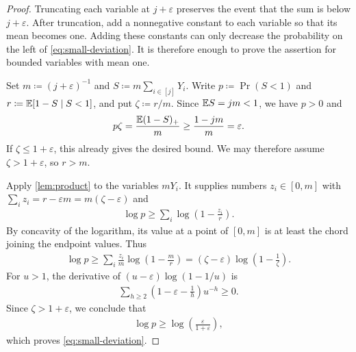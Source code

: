 \begin{proof}
Truncating each variable at $j+\varepsilon$ preserves the event that the sum is below $j+\varepsilon$.
After truncation, add a nonnegative constant to each variable so that its mean becomes one.
Adding these constants can only decrease the probability on the left of \cref{eq:small-deviation}.
It is therefore enough to prove the assertion for bounded variables with mean one.

Set $m\coloneqq(j+\varepsilon)^{-1}$ and $S\coloneqq m\sum_{i\in[j]}Y_i$.
Write $p\coloneqq\Pr(S<1)$ and $r\coloneqq\mathbb E[1-S\mid S<1]$, and put $\zeta\coloneqq r/m$.
Since $\mathbb E S=jm<1$, we have $p>0$ and
\begin{align*}
 p\zeta=\frac{\mathbb E(1-S)_+}{m}\ge\frac{1-jm}{m}=\varepsilon.
\end{align*}
If $\zeta\le1+\varepsilon$, this already gives the desired bound.
We may therefore assume $\zeta>1+\varepsilon$, so $r>m$.

Apply \cref{lem:product} to the variables $mY_i$.
It supplies numbers $z_i\in[0,m]$ with $\sum_i z_i=r-\varepsilon m=m(\zeta-\varepsilon)$ and
\begin{align*}
 \log p\ge\sum_i\log\left(1-\frac{z_i}{r}\right).
\end{align*}
By concavity of the logarithm, its value at a point of $[0,m]$ is at least the chord joining the endpoint values.
Thus
\begin{align*}
 \log p
 \ge\sum_i\frac{z_i}{m}\log\left(1-\frac mr\right)
 =(\zeta-\varepsilon)\log\left(1-\frac1\zeta\right).
\end{align*}
For $u>1$, the derivative of $(u-\varepsilon)\log(1-1/u)$ is
\begin{align*}
 \sum_{h\ge2}\left(1-\varepsilon-\frac1h\right)u^{-h}\ge0.
\end{align*}
Since $\zeta>1+\varepsilon$, we conclude that
\begin{align*}
 \log p\ge\log\left(\frac{\varepsilon}{1+\varepsilon}\right),
\end{align*}
which proves \cref{eq:small-deviation}.
\end{proof}

